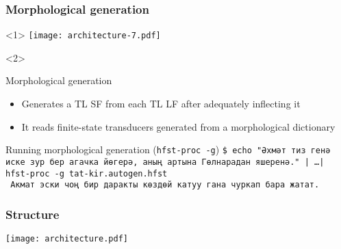 \documentclass[10pt,xetex]{beamer} %
\begin{document}
\begin{frame}
  \frametitle{Morphological generation} %

\begin{onlyenv}<1>
\texttt{[image: architecture-7.pdf]}
\end{onlyenv}
\begin{onlyenv}<2>

 \begin{block}{Morphological generation}
 \begin{itemize}
 \item Generates a TL SF from each TL LF after adequately inflecting it
 \item It reads finite-state transducers generated from a morphological dictionary 
 \end{itemize}
 \end{block}
 \begin{block}{Running morphological generation ({\tt hfst-proc -g})} %
     \texttt{\$ echo "Әхмәт тиз генә иске зур бер агачка йөгерә, аның артына Гөлнарадан яшеренә." | \ldots | hfst-proc -g tat-kir.autogen.hfst}\\
     \texttt{ Акмат эски чоң бир даракты көздөй катуу гана чуркап бара жатат.}
 \end{block}
\end{onlyenv}
\end{frame}

\begin{frame}
  \frametitle{Structure}

\texttt{[image: architecture.pdf]}

\end{frame}
\end{document}
